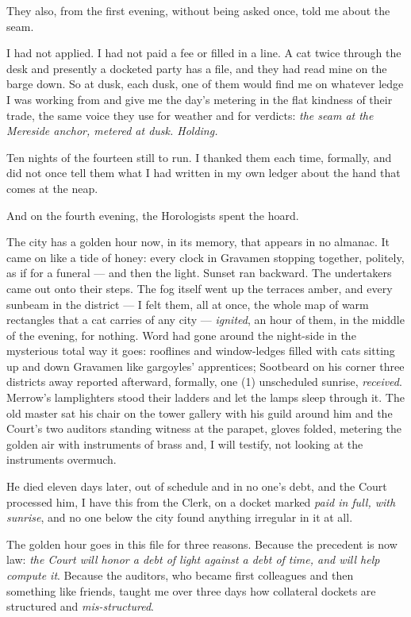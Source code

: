 They also, from the first evening, without being asked once, told me about the seam.

I had not applied. I had not paid a fee or filled in a line. A cat twice through the desk and presently a docketed party has a file, and they had read mine on the barge down. So at dusk, each dusk, one of them would find me on whatever ledge I was working from and give me the day's metering in the flat kindness of their trade, the same voice they use for weather and for verdicts: \emph{the seam at the Mereside anchor, metered at dusk. Holding.}

Ten nights of the fourteen still to run. I thanked them each time, formally, and did not once tell them what I had written in my own ledger about the hand that comes at the neap.

And on the fourth evening, the Horologists spent the hoard.

The city has a golden hour now, in its memory, that appears in no almanac. It came on like a tide of honey: every clock in Gravamen stopping together, politely, as if for a funeral --- and then the light. Sunset ran backward. The undertakers came out onto their steps. The fog itself went up the terraces amber, and every sunbeam in the district --- I felt them, all at once, the whole map of warm rectangles that a cat carries of any city --- \emph{ignited}, an hour of them, in the middle of the evening, for nothing. Word had gone around the night-side in the mysterious total way it goes: rooflines and window-ledges filled with cats sitting up and down Gravamen like gargoyles' apprentices; Sootbeard on his corner three districts away reported afterward, formally, one (1) unscheduled sunrise, \emph{received}. Merrow's lamplighters stood their ladders and let the lamps sleep through it. The old master sat his chair on the tower gallery with his guild around him and the Court's two auditors standing witness at the parapet, gloves folded, metering the golden air with instruments of brass and, I will testify, not looking at the instruments overmuch.

He died eleven days later, out of schedule and in no one's debt, and the Court processed him, I have this from the Clerk, on a docket marked \emph{paid in full, with sunrise}, and no one below the city found anything irregular in it at all.

The golden hour goes in this file for three reasons. Because the precedent is now law: \emph{the Court will honor a debt of light against a debt of time, and will help compute it}. Because the auditors, who became first colleagues and then something like friends, taught me over three days how collateral dockets are structured and \emph{mis-structured}.


